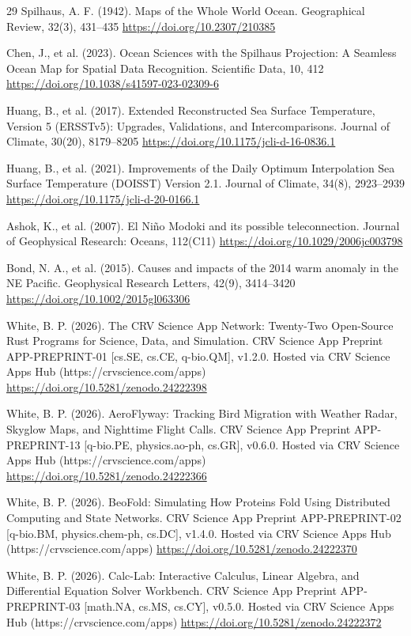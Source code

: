 \documentclass[10pt,letterpaper]{article}
\begin{document}
\begin{thebibliography}{29}
 Spilhaus, A. F. (1942). Maps of the Whole World Ocean. Geographical Review, 32(3), 431--435 \url{https://doi.org/10.2307/210385}

 Chen, J., et al. (2023). Ocean Sciences with the Spilhaus Projection: A Seamless Ocean Map for Spatial Data Recognition. Scientific Data, 10, 412 \url{https://doi.org/10.1038/s41597-023-02309-6}

 Huang, B., et al. (2017). Extended Reconstructed Sea Surface Temperature, Version 5 (ERSSTv5): Upgrades, Validations, and Intercomparisons. Journal of Climate, 30(20), 8179--8205 \url{https://doi.org/10.1175/jcli-d-16-0836.1}

 Huang, B., et al. (2021). Improvements of the Daily Optimum Interpolation Sea Surface Temperature (DOISST) Version 2.1. Journal of Climate, 34(8), 2923--2939 \url{https://doi.org/10.1175/jcli-d-20-0166.1}

 Ashok, K., et al. (2007). El Niño Modoki and its possible teleconnection. Journal of Geophysical Research: Oceans, 112(C11) \url{https://doi.org/10.1029/2006jc003798}

 Bond, N. A., et al. (2015). Causes and impacts of the 2014 warm anomaly in the NE Pacific. Geophysical Research Letters, 42(9), 3414--3420 \url{https://doi.org/10.1002/2015gl063306}

 White, B. P. (2026). The CRV Science App Network: Twenty-Two Open-Source Rust Programs for Science, Data, and Simulation. CRV Science App Preprint APP-PREPRINT-01 [cs.SE, cs.CE, q-bio.QM], v1.2.0. Hosted via CRV Science Apps Hub (https://crvscience.com/apps) \url{https://doi.org/10.5281/zenodo.24222398}

 White, B. P. (2026). AeroFlyway: Tracking Bird Migration with Weather Radar, Skyglow Maps, and Nighttime Flight Calls. CRV Science App Preprint APP-PREPRINT-13 [q-bio.PE, physics.ao-ph, cs.GR], v0.6.0. Hosted via CRV Science Apps Hub (https://crvscience.com/apps) \url{https://doi.org/10.5281/zenodo.24222366}

 White, B. P. (2026). BeoFold: Simulating How Proteins Fold Using Distributed Computing and State Networks. CRV Science App Preprint APP-PREPRINT-02 [q-bio.BM, physics.chem-ph, cs.DC], v1.4.0. Hosted via CRV Science Apps Hub (https://crvscience.com/apps) \url{https://doi.org/10.5281/zenodo.24222370}

 White, B. P. (2026). Calc-Lab: Interactive Calculus, Linear Algebra, and Differential Equation Solver Workbench. CRV Science App Preprint APP-PREPRINT-03 [math.NA, cs.MS, cs.CY], v0.5.0. Hosted via CRV Science Apps Hub (https://crvscience.com/apps) \url{https://doi.org/10.5281/zenodo.24222372}


\end{thebibliography}
\end{document}
